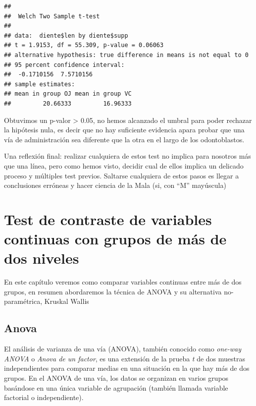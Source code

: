 \documentclass[
]{book}
\newenvironment{Shaded}{\begin{snugshade}}{\end{snugshade}}
\newcommand{\FunctionTok}[1]{\textcolor[rgb]{0.00,0.00,0.00}{#1}}
\newcommand{\NormalTok}[1]{#1}
\newcommand{\SpecialCharTok}[1]{\textcolor[rgb]{0.00,0.00,0.00}{#1}}
\begin{document}
\begin{Shaded}
\end{Shaded}

\begin{verbatim}
## 
##  Welch Two Sample t-test
## 
## data:  diente$len by diente$supp
## t = 1.9153, df = 55.309, p-value = 0.06063
## alternative hypothesis: true difference in means is not equal to 0
## 95 percent confidence interval:
##  -0.1710156  7.5710156
## sample estimates:
## mean in group OJ mean in group VC 
##         20.66333         16.96333
\end{verbatim}

Obtuvimos un p-valor \textgreater{} 0.05, no hemos alcanzado el umbral para poder rechazar la hipótesis nula, es decir que no hay suficiente evidencia apara probar que una vía de administración sea diferente que la otra en el largo de los odontoblastos.

Una reflexión final: realizar cualquiera de estos test no implica para nosotros más que una línea, pero como hemos visto, decidir cual de ellos implica un delicado proceso y múltiples test previos. Saltarse cualquiera de estos pasos es llegar a conclusiones erróneas y hacer ciencia de la Mala (si, con ``M'' mayúscula)

\hypertarget{test-de-contraste-de-variables-continuas-con-grupos-de-muxe1s-de-dos-niveles}{%
\chapter{Test de contraste de variables continuas con grupos de más de dos niveles}\label{test-de-contraste-de-variables-continuas-con-grupos-de-muxe1s-de-dos-niveles}}

En este capítulo veremos como comparar variables continuas entre más de dos grupos, en resumen abordaremos la técnica de ANOVA y su alternativa no-paramétrica, Kruskal Wallis

\hypertarget{anova}{%
\section{Anova}\label{anova}}

El análisis de varianza de una vía (ANOVA), también conocido como \emph{one-way ANOVA} o \emph{Anova de un factor}, es una extensión de la prueba \emph{t} de dos muestras independientes para comparar medias en una situación en la que hay más de dos grupos. En el ANOVA de una vía, los datos se organizan en varios grupos basándose en una única variable de agrupación (también llamada variable factorial o independiente).
\end{document}
